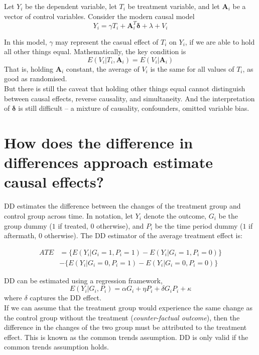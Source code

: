 \documentclass[%
 aip,
 jmp,%
 amsmath,amssymb,
 reprint,%
]{revtex4-1}
\renewcommand{\vec}[1]{\bm{#1}}
\newcommand{\term}[1]{\emph{#1}}
\begin{document}
Let $Y_i$ be the dependent variable, let $T_i$ be treatment variable, and let $\vec{A}_i$ be a vector of
control variables. Consider the modern causal model
$$Y_i = \gamma T_i + \vec{A}_i^T \vec{\delta} + \lambda + V_i$$

In this model, $\gamma$ may represent the casual effect of $T_i$ on $Y_i$, if we are able to hold all other
things equal. Mathematically, the key condition is
$$E(V_i|T_i, \vec{A}_i) = E(V_i|\vec{A}_i)$$
That is, holding $\vec{A}_i$ constant, the average of $V_i$ is the same for all values of $T_i$, as good as
randomised.\\

But there is still the caveat that holding other things equal cannot distinguish between
causal effects, reverse causality, and simultaneity. And the interpretation of $\vec{\delta}$ 
is still difficult -- a mixture of causality, confounders, omitted variable bias.\\

\section*{How does the difference in differences approach estimate causal effects? }

DD estimates the difference between the changes of the treatment group and control group across time. 
In notation, let $Y_i$ denote the outcome, $G_i$ be the group dummy ($1$ if treated, $0$ otherwise), 
and $P_i$ be the time period dummy ($1$ if aftermath, $0$ otherwise). The DD estimator of the 
average treatment effect is:

\begin{align*}
    ATE &= \{E(Y_i|G_i=1, P_i=1) - E(Y_i|G_i=1, P_i=0)\} \\
        &- \{E(Y_i|G_i=0, P_i=1) - E(Y_i|G_i=0, P_i=0)\}
\end{align*}

DD can be estimated using a regression framework, 
$$ E(Y_i|G_i, P_i) = \alpha G_i + \eta P_i + \delta G_iP_i + \kappa $$
where $\delta$ captures the DD effect.\\

If we can assume that the treatment group would experience the same change as the control group 
without the treatment (\term{counter-factual outcome}), then the difference in the changes of 
the two group must be attributed to the treatment effect. This is known as the common trends 
assumption. DD is only valid if the common trends assumption holds. \\
\end{document}
